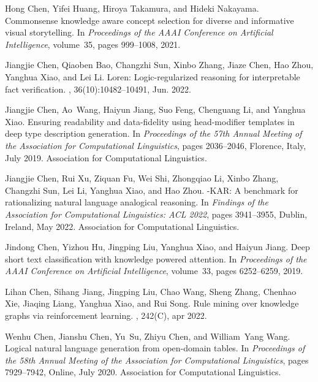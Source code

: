 \documentclass[11pt]{article}
\begin{document}
\begin{thebibliography}{100}
Hong Chen, Yifei Huang, Hiroya Takamura, and Hideki Nakayama.
\newblock Commonsense knowledge aware concept selection for diverse and
  informative visual storytelling.
\newblock In {\em Proceedings of the AAAI Conference on Artificial
  Intelligence}, volume~35, pages 999--1008, 2021.

Jiangjie Chen, Qiaoben Bao, Changzhi Sun, Xinbo Zhang, Jiaze Chen, Hao Zhou,
  Yanghua Xiao, and Lei Li.
\newblock Loren: Logic-regularized reasoning for interpretable fact
  verification.
,
  36(10):10482--10491, Jun. 2022.

Jiangjie Chen, Ao~Wang, Haiyun Jiang, Suo Feng, Chenguang Li, and Yanghua Xiao.
\newblock Ensuring readability and data-fidelity using head-modifier templates
  in deep type description generation.
\newblock In {\em Proceedings of the 57th Annual Meeting of the Association for
  Computational Linguistics}, pages 2036--2046, Florence, Italy, July 2019.
  Association for Computational Linguistics.

Jiangjie Chen, Rui Xu, Ziquan Fu, Wei Shi, Zhongqiao Li, Xinbo Zhang, Changzhi
  Sun, Lei Li, Yanghua Xiao, and Hao Zhou.
-{KAR}: A benchmark for rationalizing natural language analogical
  reasoning.
\newblock In {\em Findings of the Association for Computational Linguistics:
  ACL 2022}, pages 3941--3955, Dublin, Ireland, May 2022. Association for
  Computational Linguistics.

Jindong Chen, Yizhou Hu, Jingping Liu, Yanghua Xiao, and Haiyun Jiang.
\newblock Deep short text classification with knowledge powered attention.
\newblock In {\em Proceedings of the AAAI Conference on Artificial
  Intelligence}, volume~33, pages 6252--6259, 2019.

Lihan Chen, Sihang Jiang, Jingping Liu, Chao Wang, Sheng Zhang, Chenhao Xie,
  Jiaqing Liang, Yanghua Xiao, and Rui Song.
\newblock Rule mining over knowledge graphs via reinforcement learning.
, 242(C), apr 2022.

Wenhu Chen, Jianshu Chen, Yu~Su, Zhiyu Chen, and William~Yang Wang.
\newblock Logical natural language generation from open-domain tables.
\newblock In {\em Proceedings of the 58th Annual Meeting of the Association for
  Computational Linguistics}, pages 7929--7942, Online, July 2020. Association
  for Computational Linguistics.


\end{thebibliography}
\end{document}
